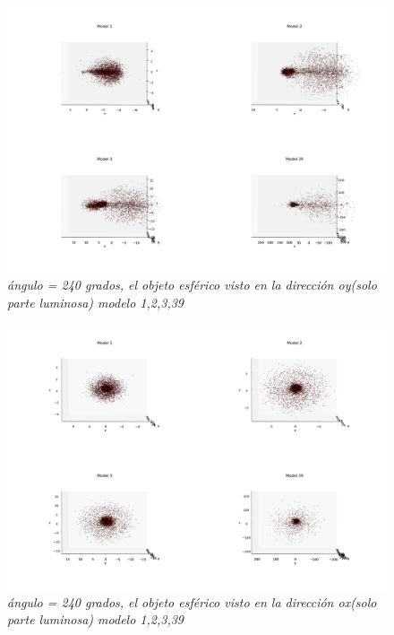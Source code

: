 \documentclass[12pt]{article} %
\renewcommand{\=}[1]{\stackrel{#1}{=}} %
\theoremstyle{definition}
\theoremstyle{remark}
\begin{document}
\begin{figure}[!ht]
 \centering
 \includegraphics[scale=0.2]{sep5-240deg-eoy.png}
 \caption{\emph{ ángulo = 240 grados, el objeto esférico visto en la dirección oy(solo parte luminosa) modelo 1,2,3,39 }}
\end{figure}

\begin{figure}[!ht]
 \centering
 \includegraphics[scale=0.2]{sep5-240deg-eox.png}
 \caption{\emph{ ángulo = 240 grados, el objeto esférico visto en la dirección ox(solo parte luminosa) modelo 1,2,3,39 }}
\end{figure}
\end{document}
